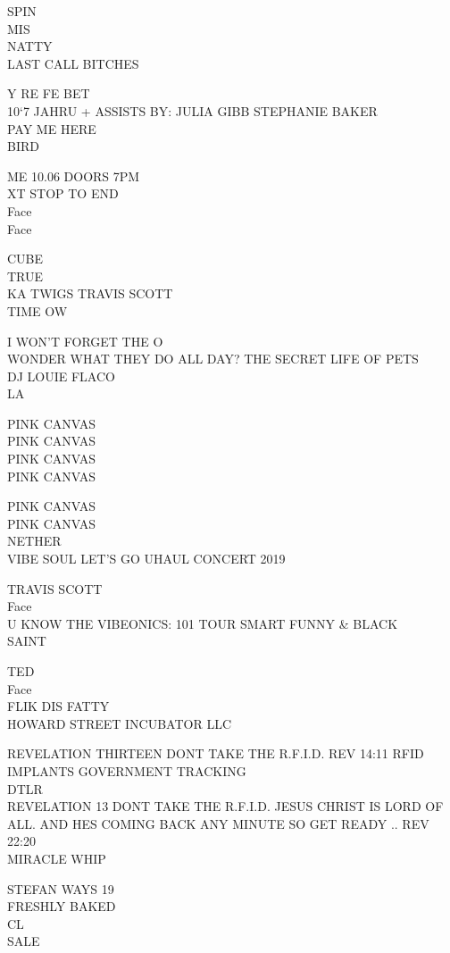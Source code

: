\documentclass[10pt,letterpaper]{article}
\begin{document}
SPIN\\
MIS\\
NATTY\\
LAST CALL BITCHES

Y RE FE BET\\
10`7 JAHRU + ASSISTS BY: JULIA GIBB STEPHANIE BAKER\\
PAY ME HERE\\
BIRD

ME 10.06 DOORS 7PM\\
XT STOP TO END\\
Face\\
Face

CUBE\\
TRUE\\
KA TWIGS TRAVIS SCOTT\\
TIME OW

I WON'T FORGET THE O\\
WONDER WHAT THEY DO ALL DAY?  THE SECRET LIFE OF PETS\\
DJ LOUIE FLACO\\
LA

PINK CANVAS\\
PINK CANVAS\\
PINK CANVAS\\
PINK CANVAS

PINK CANVAS\\
PINK CANVAS\\
NETHER\\
VIBE SOUL LET'S GO UHAUL CONCERT 2019

TRAVIS SCOTT\\
Face\\
U KNOW THE VIBEONICS: 101 TOUR SMART FUNNY \& BLACK\\
SAINT

TED\\
Face\\
FLIK DIS FATTY\\
HOWARD STREET INCUBATOR LLC

REVELATION THIRTEEN DONT TAKE THE R.F.I.D. REV 14:11 RFID IMPLANTS GOVERNMENT TRACKING\\
DTLR\\
REVELATION 13 DONT TAKE THE R.F.I.D. JESUS CHRIST IS LORD OF ALL.  AND HES COMING BACK ANY MINUTE SO GET READY .. REV 22:20\\
MIRACLE WHIP

STEFAN WAYS 19\\
FRESHLY BAKED\\
CL\\
SALE
\end{document}
